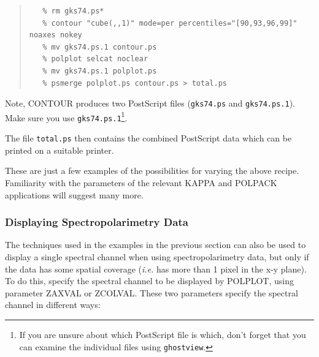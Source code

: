 \documentclass[twoside,11pt]{article}
\renewcommand{\_}{\texttt{\symbol{95}}}
\newenvironment{myquote}{\begin{quote}\begin{small}}{\end{small}\end{quote}}
\begin{document}
\begin{itemize}
\begin{myquote}
\begin{verbatim}
   % rm gks74.ps*
   % contour "cube(,,1)" mode=per percentiles="[90,93,96,99]" noaxes nokey
   % mv gks74.ps.1 contour.ps
   % polplot selcat noclear 
   % mv gks74.ps.1 polplot.ps
   % psmerge polplot.ps contour.ps > total.ps
\end{verbatim}
\end{myquote}

Note, CONTOUR produces two PostScript files (\verb+gks74.ps+ and
\verb+gks74.ps.1+). Make sure you use \verb+gks74.ps.1+\footnote{If you are
unsure about which PostScript file is which, don't forget that you can
examine the individual files using \texttt{ghostview}.}.

The file \verb+total.ps+ then  contains the combined PostScript data
which can be printed on a suitable printer.

\end{itemize}

These are just a few examples of the possibilities for varying the above
recipe. Familiarity with the parameters of the relevant KAPPA and POLPACK
applications will suggest many more.

\subsubsection{\label{SEC:SPECDISP}Displaying Spectropolarimetry Data}
The techniques used in the examples in the previous section can also be
used to display a single spectral channel when using spectropolarimetry
data, but only if the data has some spatial coverage (\emph{i.e.} has
more than 1 pixel in the x-y plane). To do this, specify the spectral
channel to be displayed by POLPLOT, using parameter ZAXVAL or
ZCOLVAL. These two parameters specify the spectral channel in different
ways:
\end{document}
